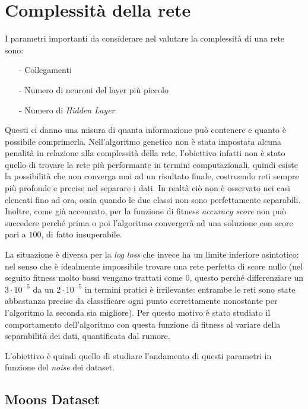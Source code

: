 \documentclass[12pt,a4paper]{report}
\begin{document}
\newpage

\section{Complessità della rete} 

I parametri importanti da considerare nel valutare la complessità di una rete sono:

\begin{enumerate}
 \item[-] Collegamenti
 \item[-] Numero di neuroni del layer più piccolo
 \item[-] Numero di \textit{Hidden Layer}
\end{enumerate}

Questi ci danno una misura di quanta informazione può contenere e quanto è possibile comprimerla.
Nell'algoritmo genetico non è stata impostata alcuna penalità in relazione alla complessità della rete, l'obiettivo infatti non è stato quello di trovare la rete più performante in termini computazionali, quindi esiste la possibilità che non converga mai ad un risultato finale, costruendo reti sempre più profonde e precise nel separare i dati.
In realtà ciò non è osservato nei casi elencati fino ad ora, ossia quando le due classi non sono perfettamente separabili. 
Inoltre, come già accennato, per la funzione di fitness \textit{accuracy score} non può succedere perché prima o poi l'algoritmo convergerà ad una soluzione con score pari a $100$\textdiscount, di fatto insuperabile.

La situazione è diversa per la \textit{log loss} che invece ha un limite inferiore asintotico: nel senso che è idealmente impossibile trovare una rete perfetta di score nullo (nel seguito fitness molto bassi vengano trattati come 0, questo perché differenziare un $3\cdot10^{-5}$ da un $2\cdot10^{-5}$ in termini pratici è irrilevante: entrambe le reti sono state abbastanza precise da classificare ogni punto correttamente nonostante per l'algoritmo la seconda sia migliore).    
Per questo motivo è stato studiato il comportamento dell'algoritmo con questa funzione di fitness al variare della separabilità dei dati, quantificata dal rumore.

L'obiettivo è quindi quello di studiare l'andamento di questi parametri in funzione del \textit{noise} dei dataset.

\subsection{Moons Dataset}
\end{document}
